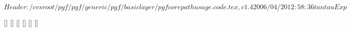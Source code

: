 \ProvidesFileRCS $Header: /cvsroot/pgf/pgf/generic/pgf/basiclayer/pgfcorepathusage.code.tex,v 1.4 2006/04/20 12:58:36 tantau Exp $

%


%
%
%

[]{\def\pgf@up@stroke{stroke}}
[]{\def\pgf@up@stroke{stroke}}
[]{\def\pgf@up@fill{fill}}
[]{\def\pgf@up@clip{clip}}
[]{}
[]{\def\pgf@up@bb{\pgf@relevantforpicturesizefalse}}


